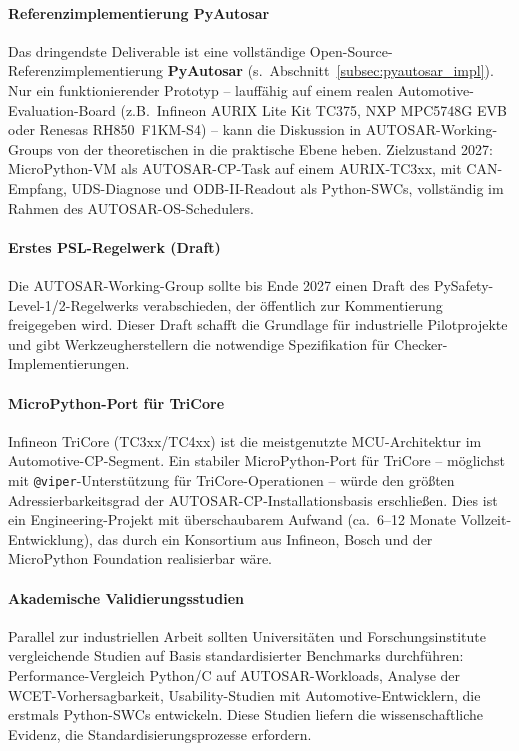 ﻿\documentclass[12pt,a4paper,twoside]{article}
\begin{document}
\paragraph{Referenzimplementierung PyAutosar}
Das dringendste Deliverable ist eine vollständige Open-Source-Referenzimplementierung
\textbf{PyAutosar} (s.~Abschnitt~\ref{subsec:pyautosar_impl}).
Nur ein funktionierender Prototyp -- lauffähig auf einem realen Automotive-Evaluation-Board
(z.B.\ Infineon AURIX Lite Kit TC375, NXP MPC5748G EVB oder Renesas RH850~F1KM-S4) --
kann die Diskussion in AUTOSAR-Working-Groups von der theoretischen
in die praktische Ebene heben.
Zielzustand 2027: MicroPython-VM als AUTOSAR-CP-Task auf einem
AURIX-TC3xx, mit CAN-Empfang, UDS-Diagnose und ODB-II-Readout
als Python-SWCs, vollständig im Rahmen des AUTOSAR-OS-Schedulers.

\paragraph{Erstes PSL-Regelwerk (Draft)}
Die AUTOSAR-Working-Group sollte bis Ende 2027 einen Draft des
PySafety-Level-1/2-Regelwerks verabschieden, der öffentlich zur Kommentierung
freigegeben wird. Dieser Draft schafft die Grundlage für industrielle Pilotprojekte
und gibt Werkzeugherstellern die notwendige Spezifikation für
Checker-Implementierungen.

\paragraph{MicroPython-Port für TriCore}
Infineon TriCore (TC3xx/TC4xx) ist die meistgenutzte MCU-Architektur
im Automotive-CP-Segment. Ein stabiler MicroPython-Port für TriCore --
möglichst mit \texttt{@viper}-Unterstützung für TriCore-Operationen --
würde den größten Adressierbarkeitsgrad der AUTOSAR-CP-Installationsbasis
erschließen.
Dies ist ein Engineering-Projekt mit überschaubarem Aufwand (ca.\ 6--12 Monate
Vollzeit-Entwicklung), das durch ein Konsortium aus Infineon,
Bosch und der MicroPython Foundation realisierbar wäre.

\paragraph{Akademische Validierungsstudien}
Parallel zur industriellen Arbeit sollten Universitäten und Forschungsinstitute
vergleichende Studien auf Basis standardisierter Benchmarks durchführen:
Performance-Vergleich Python/C auf AUTOSAR-Workloads, Analyse der
WCET-Vorhersagbarkeit, Usability-Studien mit Automotive-Entwicklern,
die erstmals Python-SWCs entwickeln.
Diese Studien liefern die wissenschaftliche Evidenz,
die Standardisierungsprozesse erfordern.
\end{document}
